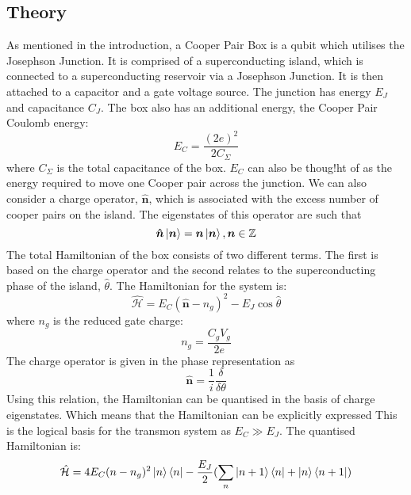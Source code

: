 \documentclass[11pt]{article}
\newcommand*{\hatH}{\hat{\mathcal{H}}}
\begin{document}
\subsection{Theory}
As mentioned in the introduction, a Cooper Pair Box is a qubit which utilises the Josephson Junction. It is comprised of a superconducting island, which is connected to a superconducting reservoir via a Josephson Junction. It is then attached to a capacitor and a gate voltage source. The junction has energy $E_J$ and capacitance $C_J$. The box also has an additional energy, the Cooper Pair Coulomb energy:
\begin{equation} \label{eq:1}
E_C =  \frac{(2e)^2}{2C_\Sigma}
\end{equation}
where $C_\Sigma$ is the total capacitance of the box. $E_C$ can also be thoug!ht of as the energy required to move one Cooper pair across the junction. We can also consider a charge operator, $\boldsymbol{\hat{n}}$, which is associated with the excess number of cooper pairs on the island. The eigenstates of this operator are such that
\begin{equation} \label{eq:2}
\boldsymbol{\hat{n}}\ket{\boldsymbol{n}} = \boldsymbol{n}\ket{\boldsymbol{n}},  \boldsymbol{n} \in \mathbb{Z}
\end{equation}
The total Hamiltonian of the box consists of two different terms. The first is based on the charge operator and the second relates to the superconducting phase of the island, $\hat{\theta}$. The Hamiltonian for the system is:
\begin{equation} \label{eq:3}
\hatH = E_C (\boldsymbol{\hat{n}} - n_g)^2 - E_J \cos{\hat{\theta}}
\end{equation}
where $n_g$ is the reduced gate charge:
\begin{equation} \label{eq:4}
n_g = \frac{C_g V_g}{2e}
\end{equation}
The charge operator is given in the phase representation as
\begin{equation} \label{eq:5}
\boldsymbol{\hat{n}} = \frac{1}{i} \frac{\delta}{\delta\theta}
\end{equation}
Using this relation, the Hamiltonian can be quantised in the basis of charge eigenstates. Which means that the Hamiltonian can be explicitly expressed  This is the logical basis for the transmon system as $E_C \gg E_J$. The quantised Hamiltonian is:
\begin{equation} \label{eq:6}
\hatH = 4E_C (n-n_g)^2 \ket{n}\bra{n} - \frac{E_J}{2}(\sum_{n} \ket{n+1}\bra{n} + \ket{n}\bra{n+1})
\end{equation}
\end{document}
